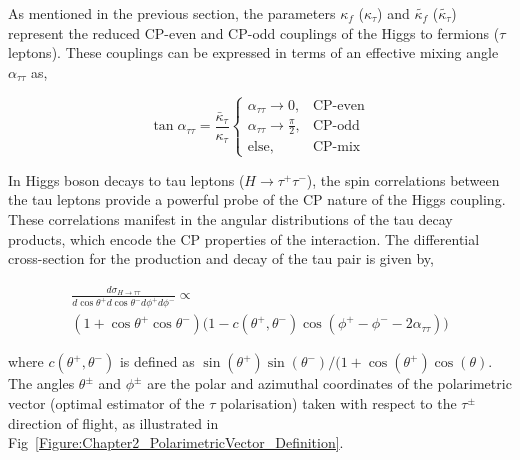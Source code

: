 As mentioned in the previous section, the parameters $\kappa_f$ ($\kappa_\tau$) and $\tilde{\kappa_f}$ ($\tilde{\kappa_\tau}$) represent the reduced CP-even and CP-odd couplings of the Higgs to fermions ($\tau$ leptons). These couplings can be expressed in terms of an effective mixing angle $\alpha_{\tau\tau}$ as,

\begin{equation}
\tan \alpha_{\tau\tau} = \frac{\bar{\kappa}_\tau}{\kappa_\tau} 
\begin{cases}
    \alpha_{\tau\tau} \to 0, & \text{CP-even} \\
    \alpha_{\tau\tau} \to \frac{\pi}{2}, & \text{CP-odd} \\
    \text{else}, & \text{CP-mix}
\end{cases}
\label{Equation:Chapter2-NormalScenario}
\end{equation}

In Higgs boson decays to tau leptons (\(H \to \tau^+ \tau^-\)), the spin correlations between the tau leptons provide a powerful probe of the CP nature of the Higgs coupling. These correlations manifest in the angular distributions of the tau decay products, which encode the CP properties of the interaction. The differential cross-section for the production and decay of the tau pair is given by,

\begin{equation}
\begin{array}{c}
{\displaystyle
\frac{d\sigma_{H\to\tau\tau}}{d\cos\theta^+ d\cos\theta^- d\phi^+ d\phi^-} \propto
} \\[10pt]
{\displaystyle
(1 + \cos\theta^+ \cos\theta^-) \Big(1 - c(\theta^+, \theta^-) \cos(\phi^+ - \phi^- - 2\alpha_{\tau\tau})\Big)
}
\end{array}
\label{Equation:Chapter2_TauDifferentialXS}
\end{equation}

where $c(\theta^+, \theta^-)$ is defined as $\sin(\theta^+)\sin(\theta^-)/(1+\cos(\theta^+)\cos(\theta)$. The angles $\theta^\pm$ and $\phi^\pm$ are the polar and azimuthal coordinates of the polarimetric vector (optimal estimator of the $\tau$ polarisation) taken with respect to the $\tau^\pm$ direction of flight, as illustrated in Fig~\ref{Figure:Chapter2_PolarimetricVector_Definition}.

